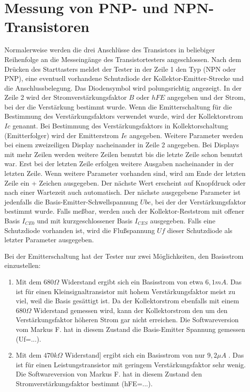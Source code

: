 \section{Messung von PNP- und NPN-Transistoren}
Normalerweise werden die drei Anschlüsse des Transistors in beliebiger Reihenfolge an die Messeingänge des
Transistortesters angeschlossen.
Nach dem Drücken des Starttasters meldet der Tester in der Zeile 1 den Typ (NPN oder PNP), 
eine eventuell vorhandene Schutzdiode der Kollektor-Emitter-Strecke und
die Anschlussbelegung. Das Diodensymbol wird  polungsrichtig angezeigt.
In der Zeile 2 wird der Stromverstärkungsfaktor \(B\) oder \(hFE\) angegeben und der Strom, bei der die Verstärkung
bestimmt wurde. Wenn die Emitterschaltung für die Bestimmung des Verstärkungsfaktors verwendet wurde,
wird der Kollektorstrom \(Ic\) genannt. Bei Bestimmung des Verstärkungsfaktors in Kollektorschaltung (Emitterfolger)
wird der Emitterstrom \(Ie\) angegeben. Weitere Parameter werden bei einem zweizeiligen Display
nacheinander in Zeile 2 angegeben. Bei Displays mit mehr Zeilen werden weitere Zeilen benutzt bis
die letzte Zeile schon benutzt war.
Erst bei der letzten Zeile erfolgen weitere Ausgaben nacheinander in der letzten Zeile.
Wenn weitere Parameter vorhanden sind, wird am Ende der letzten Zeile ein + Zeichen ausgegeben.
Der nächste Wert erscheint auf Knopfdruck oder nach einer Wartezeit auch automatisch.
Der nächste ausgegebene Parameter ist jedenfalls die Basis-Emitter-Schwellspannung \(Ube\),
bei der der Verstärkungsfaktor bestimmt wurde.
Falls meßbar, werden auch der Kollektor-Reststrom mit offener Basis \(I_{CE0}\) und mit kurzgeschlossener
Basis \(I_{CES}\) ausgegeben.
Falls eine Schutzdiode vorhanden ist, wird die Flußspannung \(Uf\) dieser Schutzdiode als letzter Parameter ausgegeben.


Bei der Emitterschaltung hat der Tester nur zwei Möglichkeiten, den Basisstrom einzustellen:
\begin{enumerate}
\item Mit dem \(680\Omega\) Widerstand ergibt sich ein Basisstrom von etwa \(6,1mA\). Das ist für einen
Kleinsignaltransistor mit hohem Verstärkungsfaktor meist zu viel, weil die Basis gesättigt ist.
Da der Kollektorstrom ebenfalls mit einem \(680\Omega\) Widerstand gemessen wird, kann der Kollektorstrom
den um den Verstärkungsfaktor höheren Strom gar nicht erreichen. Die Softwareversion vom Markus F. hat
in diesem Zustand die Basis-Emitter Spannung gemessen (Uf=...).\\
\item Mit dem \(470k\Omega\) Widerstand] ergibt sich ein Basisstrom von nur \(9,2\mu A\) .
Das ist für einen Leistungstransistor mit geringem Verstärkungsfaktor sehr wenig.
Die Softwareversion von Markus F. hat in diesem Zustand den Stromverstärkungsfaktor bestimmt (hFE=...).\\
\end{enumerate}

